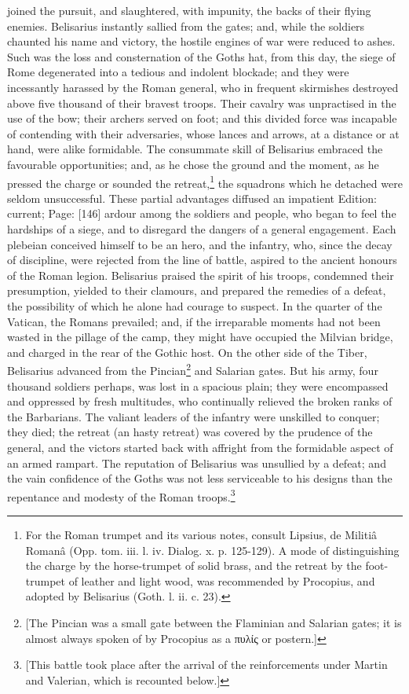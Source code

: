 joined the pursuit, and slaughtered, with impunity, the backs of their flying enemies. Belisarius instantly sallied from the gates; and, while the soldiers chaunted his name and victory, the hostile engines of war were reduced to ashes. Such was the loss and consternation of the Goths hat, from this day, the siege of Rome degenerated into a tedious and indolent blockade; and they were incessantly harassed by the Roman general, who in frequent skirmishes destroyed above five thousand of their bravest troops. Their cavalry was unpractised in the use of the bow; their archers served on foot; and this divided force was incapable of contending with their adversaries, whose lances and arrows, at a distance or at hand, were alike formidable. The consummate skill of Belisarius embraced the favourable opportunities; and, as he chose the ground and the moment, as he pressed the charge or sounded the retreat,\footnote{For the Roman trumpet and its various notes, consult Lipsius, de Militiâ Romanâ (Opp. tom. iii. l. iv. Dialog. x. p. 125-129). A mode of distinguishing the charge by the horse-trumpet of solid brass, and the retreat by the foot-trumpet of leather and light wood, was recommended by Procopius, and adopted by Belisarius (Goth. l. ii. c. 23).} the squadrons which he detached were seldom unsuccessful. These partial advantages diffused an impatient Edition: current; Page: [146] ardour among the soldiers and people, who began to feel the hardships of a siege, and to disregard the dangers of a general engagement. Each plebeian conceived himself to be an hero, and the infantry, who, since the decay of discipline, were rejected from the line of battle, aspired to the ancient honours of the Roman legion. Belisarius praised the spirit of his troops, condemned their presumption, yielded to their clamours, and prepared the remedies of a defeat, the possibility of which he alone had courage to suspect. In the quarter of the Vatican, the Romans prevailed; and, if the irreparable moments had not been wasted in the pillage of the camp, they might have occupied the Milvian bridge, and charged in the rear of the Gothic host. On the other side of the Tiber, Belisarius advanced from the Pincian\footnote{[The Pincian was a small gate between the Flaminian and Salarian gates; it is almost always spoken of by Procopius as a \textgreek{πυλίς} or postern.]} and Salarian gates. But his army, four thousand soldiers perhaps, was lost in a spacious plain; they were encompassed and oppressed by fresh multitudes, who continually relieved the broken ranks of the Barbarians. The valiant leaders of the infantry were unskilled to conquer; they died; the retreat (an hasty retreat) was covered by the prudence of the general, and the victors started back with affright from the formidable aspect of an armed rampart. The reputation of Belisarius was unsullied by a defeat; and the vain confidence of the Goths was not less serviceable to his designs than the repentance and modesty of the Roman troops.\footnote{[This battle took place after the arrival of the reinforcements under Martin and Valerian, which is recounted below.]}

